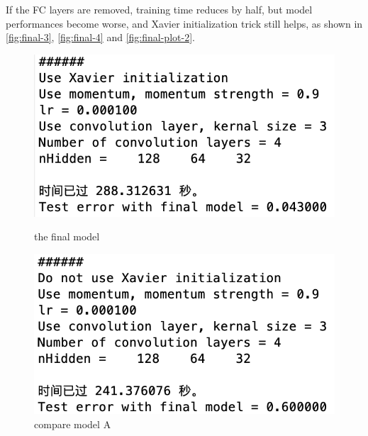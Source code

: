 \documentclass[10pt]{article}
\begin{document}
If the FC layers are removed, training time reduces by half, but model performances become worse, and Xavier initialization trick still helps, as shown in \autoref{fig:final-3}, \autoref{fig:final-4} and \autoref{fig:final-plot-2}.

\begin{figure}[htbp]
  \centering
  \begin{minipage}{0.48\linewidth}
    \centering
    \includegraphics[width=\linewidth]{figures/final-1.png}
    \caption{the final model}
    \label{fig:final-1}
  \end{minipage}
  \begin{minipage}{0.48\linewidth}
    \centering
    \includegraphics[width=\linewidth]{figures/final-2.png}
    \caption{compare model A}
    \label{fig:final-2}
  \end{minipage}
\end{figure}
\end{document}
